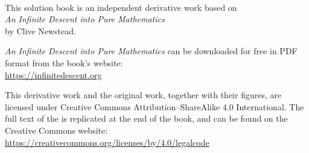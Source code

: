 {\small
~

\vfill

This solution book is an independent derivative work based on \\
\textit{An Infinite Descent into Pure Mathematics} \\
by Clive Newstead.

\thispagestyle{empty}


\begin{minipage}{0.75\textwidth}
\small
\textit{An Infinite Descent into Pure Mathematics} can be downloaded for free in PDF format from the book's website:\\
\url{https://infinitedescent.org}
\end{minipage}

\begin{minipage}{0.75\textwidth}
\small
This derivative work and the original work, together with their figures, are licensed under Creative Commons Attribution--ShareAlike 4.0 International. The full text of the  is replicated at the end of the book, and can be found on the Creative Commons website:\\
\url{https://creativecommons.org/licenses/by/4.0/legalcode}
\end{minipage}

}
